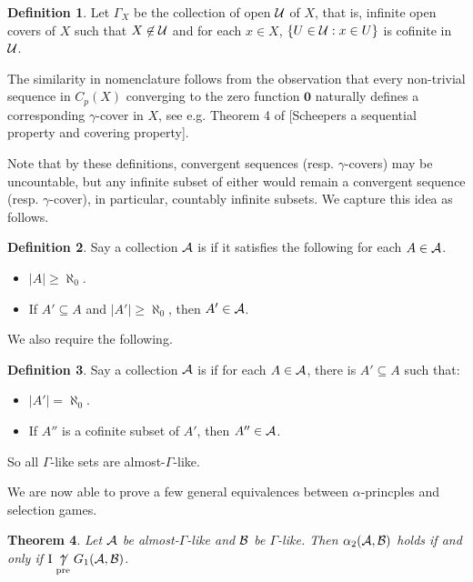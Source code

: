 \documentclass{amsart}
\renewcommand{\vec}{\mathbf}
\theoremstyle{plain}
\newtheorem{theorem}{Theorem}
\theoremstyle{definition}
\newtheorem{definition}[theorem]{Definition}
\theoremstyle{remark}
\theoremstyle{plain}
\theoremstyle{definition}
\theoremstyle{remark}
\begin{document}
\begin{definition}
Let \(\Gamma_X\) be the collection of open  \(\mathcal{U}\) of \(X\),
that is, infinite open covers of \(X\) such that \(X\not\in \mathcal{U}\) and for each \(x\in X\),
\(\{U\in\mathcal{U}:x\in U\}\) is cofinite in \(\mathcal{U}\).
\end{definition}

The similarity in nomenclature follows from the observation that every non-trivial sequence in
\(C_p(X)\) converging to the zero function \(\vec{0}\) naturally defines a corresponding
\(\gamma\)-cover in \(X\), see e.g. Theorem 4 of
[Scheepers a sequential property and covering property].

Note that by these definitions, convergent sequences (resp. \(\gamma\)-covers) may be uncountable,
but any infinite subset of either would remain a convergent sequence (resp. \(\gamma\)-cover),
in particular, countably infinite subsets. We capture this idea as follows.

\begin{definition}
Say a collection \(\mathcal{A}\) is  if it satisfies the following
for each \(A\in\mathcal{A}\).
\begin{itemize}
\item \(|A|\geq\aleph_0\).
\item If \(A'\subseteq A\) and \(|A'|\geq\aleph_0\), then \(A'\in\mathcal{A}\).
\end{itemize}
\end{definition}

We also require the following.

\begin{definition}
Say a collection \(\mathcal{A}\) is  if
for each \(A\in\mathcal{A}\), there is \(A'\subseteq A\) such that:
\begin{itemize}
\item \(|A'|=\aleph_0\).
\item If \(A''\) is a cofinite subset of \(A'\), then \(A''\in\mathcal{A}\).
\end{itemize}
\end{definition}

So all \(\Gamma\)-like sets are almost-\(\Gamma\)-like.

We are now able to prove a few general equivalences between \(\alpha\)-princples
and selection games.

\begin{theorem}
Let \(\mathcal{A}\) be almost-\(\Gamma\)-like and \(\mathcal{B}\) be \(\Gamma\)-like. 
Then \(\alpha_2(\mathcal{A},\mathcal{B})\) holds if and only
if \(\mathrm{I}\underset{\text{pre}}{\not\uparrow} G_1(\mathcal{A},\mathcal{B})\).
\end{theorem}
\end{document}
